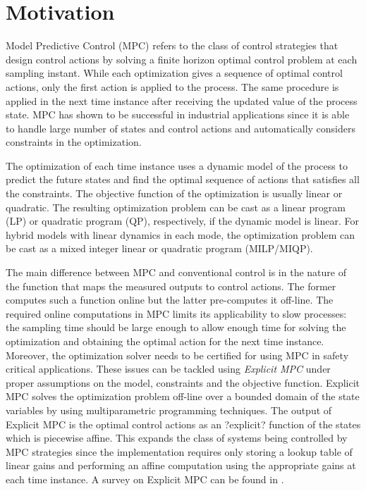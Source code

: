 \section{Motivation}\label{sec:example}

Model Predictive Control (MPC) refers to the class of control strategies that design control actions by solving a finite horizon optimal control problem at each sampling instant. While each optimization gives a sequence of optimal control actions, only the first action is applied to the process. The same procedure is applied in the next time instance after receiving the updated value of the process state. MPC has shown to be successful in industrial applications since it is able to handle large number of states and control actions and automatically considers constraints in the optimization.

The optimization of each time instance uses a dynamic model of the process to predict the future states and find the optimal sequence of actions that satisfies all the constraints. The objective function of the optimization is usually linear or quadratic. The resulting optimization problem can be cast as a linear program (LP) or quadratic program (QP), respectively, if the dynamic model is linear. For hybrid models with linear dynamics in each mode, the optimization problem can be cast as a mixed integer linear or quadratic program (MILP/MIQP). 

 The main difference between MPC and conventional control is in the nature of the function that maps the measured outputs to control actions. The former computes such a function online but the latter pre-computes it off-line. The required online computations in MPC limits its applicability to slow processes: the sampling time should be large enough to allow enough time for solving the optimization and obtaining the optimal action for the next time instance. Moreover, the optimization solver needs to be certified for using MPC in safety critical applications.
These issues can be tackled using \emph{Explicit MPC} under proper assumptions on the model, constraints and the objective function. Explicit MPC solves the optimization problem off-line over a bounded domain of the state variables by using multiparametric programming techniques. The output of Explicit MPC is the optimal control actions as an ?explicit? function of the states which is piecewise affine. This expands the class of systems being controlled by MPC strategies since the implementation requires only storing a lookup table of linear gains and performing an affine computation using the appropriate gains at each time instance. A survey on Explicit MPC can be found in \cite{Alessio2009}.

